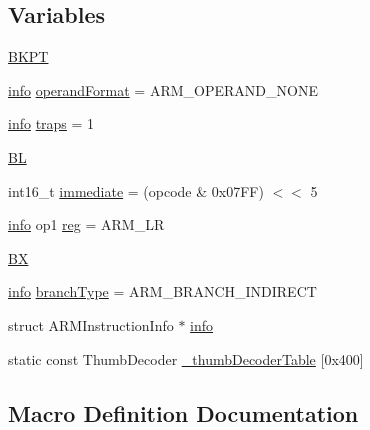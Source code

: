 \subsection*{Variables}
\begin{DoxyCompactItemize}
\item 
\mbox{\hyperlink{decoder-thumb_8c_ada39db97dab5656c737ecdd20e83feca}{B\+K\+PT}}
\item 
\mbox{\hyperlink{libretro_8h_a283ad41e4809f9c0ebe736a9861d8a91}{info}} \mbox{\hyperlink{decoder-thumb_8c_a52313e50f86644324806d9228ecd8472}{operand\+Format}} = A\+R\+M\+\_\+\+O\+P\+E\+R\+A\+N\+D\+\_\+\+N\+O\+NE
\item 
\mbox{\hyperlink{libretro_8h_a283ad41e4809f9c0ebe736a9861d8a91}{info}} \mbox{\hyperlink{decoder-thumb_8c_afe08430c255629bed908d9bf22397277}{traps}} = 1
\item 
\mbox{\hyperlink{decoder-thumb_8c_adafdf5f045e21581219028370836474d}{BL}}
\item 
int16\+\_\+t \mbox{\hyperlink{decoder-thumb_8c_a5fa4c1a4173190a0769b8b390dc82ac3}{immediate}} = (opcode \& 0x07\+F\+F) $<$$<$ 5
\item 
\mbox{\hyperlink{libretro_8h_a283ad41e4809f9c0ebe736a9861d8a91}{info}} op1 \mbox{\hyperlink{decoder-thumb_8c_af44c02f7785479603f59b662f3dfae6a}{reg}} = A\+R\+M\+\_\+\+LR
\item 
\mbox{\hyperlink{decoder-thumb_8c_aae92ee51d7cebfa199f33594fe133f31}{BX}}
\item 
\mbox{\hyperlink{libretro_8h_a283ad41e4809f9c0ebe736a9861d8a91}{info}} \mbox{\hyperlink{decoder-thumb_8c_a8dbbd417010e59d26bfaf79cb6139102}{branch\+Type}} = A\+R\+M\+\_\+\+B\+R\+A\+N\+C\+H\+\_\+\+I\+N\+D\+I\+R\+E\+CT
\item 
struct A\+R\+M\+Instruction\+Info $\ast$ \mbox{\hyperlink{decoder-thumb_8c_aeca70e5aff156874f361d0a389970f7b}{info}}
\item 
static const Thumb\+Decoder \mbox{\hyperlink{decoder-thumb_8c_a698cace0f33777aceeb5b1bb0fc98170}{\+\_\+thumb\+Decoder\+Table}} \mbox{[}0x400\mbox{]}
\end{DoxyCompactItemize}


\subsection{Macro Definition Documentation}
\mbox{\label{decoder-thumb_8c_ae98e90d8562d44b0a917b60365c03672}} 

